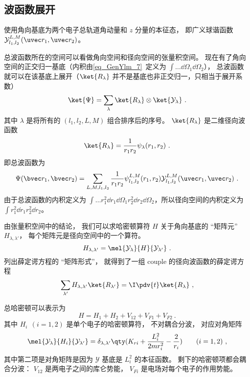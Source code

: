 

\subsection{波函数展开}
使用角向基底为两个电子总轨道角动量和 $z$ 分量的本征态， 即广义球谐函数 $\mathcal{Y}_{l_1,l_2}^{L,M}(\uvec r_1, \uvec r_2)$。

总波函数所在的空间可以看做角向空间和径向空间的张量积空间。 现在有了角向空间的正交归一基底（内积由\autoref{eq_GenYlm_7}~定义为 $\int \dots \dd{\Omega_1} \dd{\Omega_2}$）， 总波函数就可以在该基底上展开（$\ket{R_\lambda}$ 并不是基底也非正交归一，只相当于展开系数）
\begin{equation}
\ket{\Psi} = \sum_\lambda \ket{R_\lambda}\otimes\ket{\mathcal{Y_\lambda}}~.
\end{equation}
其中 $\lambda$ 是将所有的 $(l_1,l_2,L,M)$ 组合排序后的序号。 $\ket{R_\lambda}$ 是二维径向波函数
\begin{equation}\label{eq_HeTDSE_6}
\ket{R_\lambda} = \frac{1}{r_1 r_2} \psi_\lambda(r_1, r_2)~.
\end{equation}
即总波函数为
\begin{equation}\label{eq_HeTDSE_2}
\Psi(\bvec r_1, \bvec r_2) = \sum_{L, M, l_1, l_2}  \frac{1}{r_1 r_2} \psi_{l_1, l_2}^{L, M}(r_1, r_2)\mathcal{Y}_{l_1, l_2}^{L, M}(\uvec r_1, \uvec r_2)~.
\end{equation}
由于总波函数的内积定义为 $\int \dots r_1^2\dd{r_1}\dd{\Omega_1} r_2^2\dd{r_2}\dd{\Omega_2}$，所以径向空间的内积定义为 $\int r_1^2 \dd{r_1} r_2^2\dd{r_2}$。

由张量积空间中的结论， 我们可以求哈密顿算符 $H$ 关于角向基底的 “矩阵元” $H_{\lambda, \lambda'}$， 每个矩阵元是径向空间中的一个算符。
\begin{equation}
H_{\lambda, \lambda'} = \mel{\mathcal{Y}_{\lambda}}{H}{\mathcal{Y}_{\lambda'}}~.
\end{equation}
列出薛定谔方程的 “矩阵形式”， 就得到了一组 couple 的径向波函数的薛定谔方程
\begin{equation}
\sum_{\lambda'} H_{\lambda, \lambda'} \ket{R_{\lambda'}} = \I \pdv{t} \ket{R_{\lambda}}~,
\end{equation}

总哈密顿可以表示为
\begin{equation}
H = H_1 + H_2 + V_{12} + V_{F1} + V_{F2}~.
\end{equation}
其中 $H_i \ \ (i = 1, 2)$ 是单个电子的哈密顿算符， 不对耦合分波， 对应对角矩阵
\begin{equation}
\mel{\mathcal{Y}_{\lambda}}{H_i}{\mathcal{Y}_{\lambda'}} = \delta_{\lambda,\lambda'} \qty(K_{ri} + \frac{L_i^2}{2m r_i^2} - \frac{2}{r_i}) \qquad (i = 1,2)~,
\end{equation}
其中第二项是对角矩阵是因为 $\mathcal Y$ 基底是 $L_i^2$ 的本征函数。 剩下的哈密顿项都会耦合分波： $V_{12}$ 是两电子之间的库仑势能， $V_{Fi}$ 是电场对每个电子的作用势能。

